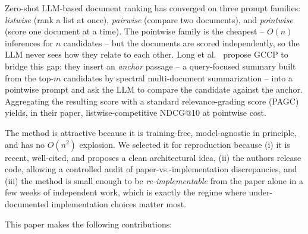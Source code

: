 \documentclass[sigconf]{acmart}
\begin{document}
Zero-shot LLM-based document ranking has converged on three
prompt families: \emph{listwise} (rank a list at once), \emph{pairwise}
(compare two documents), and \emph{pointwise} (score one document at a
time). The pointwise family is the cheapest -- $O(n)$ inferences for
$n$ candidates -- but the documents are scored independently, so the
LLM never sees how they relate to each other. Long et al.~\cite{long2025precise}
propose GCCP to bridge this gap: they insert an \emph{anchor} passage
-- a query-focused summary built from the top-$m$ candidates by spectral
multi-document summarization -- into a pointwise prompt and ask the
LLM to compare the candidate against the anchor. Aggregating the
resulting score with a standard relevance-grading score (PAGC)
yields, in their paper, listwise-competitive NDCG@10 at pointwise
cost.

The method is attractive because it is training-free, model-agnostic
in principle, and has no $O(n^2)$ explosion. We selected it for
reproduction because (i) it is recent, well-cited, and proposes a
clean architectural idea, (ii) the authors release code, allowing a
controlled audit of paper-vs.-implementation discrepancies, and (iii)
the method is small enough to be \emph{re-implementable} from the
paper alone in a few weeks of independent work, which is exactly
the regime where under-documented implementation choices matter
most.

This paper makes the following contributions:
\end{document}
